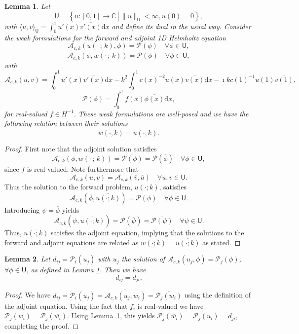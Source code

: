 \documentclass[12pt]{amsart}
\newtheorem{lma}{Lemma}
\begin{document}
\begin{lma}
\label{lma:hlmholtz1}
Let 
\[
\mathsf{U} = \left\{ u : [0,1]\rightarrow \mathbb{C} \, \left|\, \|u\|_{\mathsf{U}} < \infty, u(0) = 0\right.\right\},
\]
with $\langle u, v \rangle_\mathsf{U} = \int_0^1 u'(x)\overline{v'(x)}\mathrm{d}x$ and define its dual in the usual way.  Consider the weak formulations for the forward and adjoint 1D Helmholtz equation
\[
\mathcal{A}_{c,k}(u(\cdot\,;\, k), \phi) = \mathcal{P}(\phi)\quad \forall \phi \in \mathsf{U},
\]
\[
\overline{\mathcal{A}_{c,k}(\phi, w(\cdot \,;\, k))} = \mathcal{P}(\phi)\quad \forall \phi \in \mathsf{U},
\]
with
\[
\mathcal{A}_{c,k}(u,v) = \int_0^1 u'(x) \overline{v'(x)}\mathrm{d}x - k^2 \int_0^1 c(x)^{-2}u(x) \overline{v(x)}\mathrm{d}x -\imath k c(1)^{-1}u(1)\overline{v(1)},
\]
\[
\mathcal{P}(\phi) = \int_0^1 f(x)\overline{\phi(x)}\mathrm{d}x,
\]
for real-valued $f\in H^{-1}$. These weak formulations are well-posed \cite{Ihlenburg1997} and we have the following relation between their solutions
\[
w(\cdot,k) = \overline{u(\cdot,k)}.
\]
\end{lma}
\begin{proof}
First note that the adjoint solution satisfies
\[
\mathcal{A}_{c,k}(\phi, w(\cdot \,;\, k)) = \overline{\mathcal{P}(\phi)} = \mathcal{P}(\overline{\phi})\quad \forall \phi \in \mathsf{U},
\]
since $f$ is real-valued. Note furthermore that
\[
\mathcal{A}_{c,k}(u,v) = \mathcal{A}_{c,k}(\overline{v},\overline{u})\quad \forall u,v\in\mathsf{U}.
\]
Thus the solution to the forward problem, $u(\cdot;k)$, satisfies
\[
\mathcal{A}_{c,k}(\overline{\phi},\overline{u(\cdot;k)})=\mathcal{P}({\phi})\quad\forall\phi\in\mathsf{U}.
\]
Introducing $\psi = \overline{\phi}$ yields
\[
\mathcal{A}_{c,k}(\psi,\overline{u(\cdot;k)})=\mathcal{P}(\overline{\psi}) =\overline{\mathcal{P}(\psi)}\quad\forall\psi\in\mathsf{U}.
\]
Thus, $\overline{u(\cdot;k)}$ satisfies the adjoint equation, implying that the solutions to the forward and adjoint equations are related as $w(\cdot;k)=\overline{u(\cdot;k)}$ as stated.
\end{proof}

\begin{lma}
\label{lma:hlmholtz3}
Let $d_{ij} = \mathcal{P}_i(u_j)$ with $u_j$ the solution of $\mathcal{A}_{c,k}(u_j,\phi)=\mathcal{P}_j(\phi)$, $\forall \phi \in \mathsf{U}$, as defined in Lemma \ref{lma:hlmholtz1}. Then we have 
\[
d_{ij} = d_{ji}.
\]
\end{lma}
\begin{proof}
We have $d_{ij}=\mathcal{P}_i(u_j) = \overline{\mathcal{A}_{c,k}(u_j,w_i)} = \overline{\mathcal{P}_j(w_i)}$ using the definition of the adjoint equation. 
Using the fact that $f_i$ is real-valued we have $\overline{\mathcal{P}_j(w_i)}=\mathcal{P}_j(\overline{w_i})$. Using Lemma~\ref{lma:hlmholtz1}, this yields $\mathcal{P}_j(\overline{w_i}) = \mathcal{P}_j(u_i) = d_{ji}$, completing the proof.
\end{proof}
\end{document}
